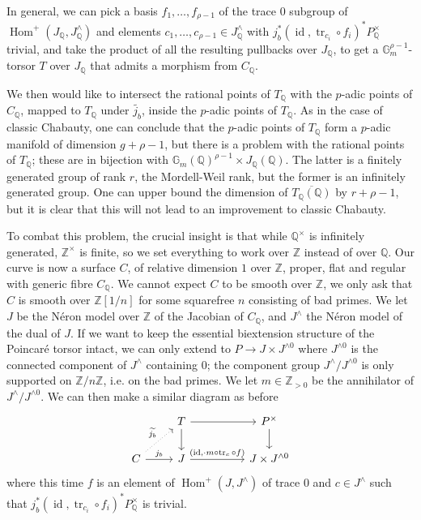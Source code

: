 \documentclass[12pt]{article}
\newcommand{\Z}{\mathbb{Z}}
\renewcommand{\G}{\mathbb{G}}
\newcommand{\Q}{\mathbb{Q}}
\DeclareMathOperator{\Hom}{Hom}
\DeclareMathOperator{\id}{id}
\DeclareMathOperator{\tr}{tr}
\theoremstyle{plain}
\theoremstyle{definition}
\theoremstyle{remark}
\begin{document}
In general, we can pick a basis $f_1,\dots,f_{\rho-1}$ of the trace $0$ subgroup of $\Hom^+(J_\Q,J^\wedge_\Q)$ and elements $c_1,\dots,c_{\rho-1} \in J_\Q^\wedge$ with $j_b^* (\id,\tr_{c_i} \circ f_i)^* P_{\Q}^\times$ trivial, and take the product of all the resulting pullbacks over $J_\Q$, to get a $\G_m^{\rho-1}$-torsor $T$ over $J_\Q$ that admits a morphism from $C_\Q$.

We then would like to intersect the rational points of $T_\Q$ with the $p$-adic points of $C_\Q$, mapped to $T_\Q$ under $\widetilde{j_b}$, inside the $p$-adic points of $T_\Q$. As in the case of classic Chabauty, one can conclude that the $p$-adic points of $T_\Q$ form a $p$-adic manifold of dimension $g+\rho-1$, but there is a problem with the rational points of $T_\Q$; these are in bijection with $\G_m(\Q)^{\rho-1} \times J_\Q(\Q)$. The latter is a finitely generated group of rank $r$, the Mordell-Weil rank, but the former is an infinitely generated group. One can upper bound the dimension of $\overline{T_\Q(\Q)}$ by $r + \rho -1$, but it is clear that this will not lead to an improvement to classic Chabauty.

To combat this problem, the crucial insight is that while $\Q^\times$ is infinitely generated, $\Z^\times$ is finite, so we set everything to work over $\Z$ instead of over $\Q$. Our curve is now a surface $C$, of relative dimension $1$ over $\Z$, proper, flat and regular with generic fibre $C_\Q$. We cannot expect $C$ to be smooth over $\Z$, we only ask that $C$ is smooth over $\Z[1/n]$ for some squarefree $n$ consisting of bad primes. We let $J$ be the N\'eron model over $\Z$ of the Jacobian of $C_\Q$, and $J^\wedge$ the N\'eron model of the dual of $J$. If we want to keep the essential biextension structure of the Poincar\'e torsor intact, we can only extend to $P \to J \times J^{\wedge 0}$ where $J^{\wedge 0}$ is the connected component of $J^\wedge$ containing $0$; the component group $J^\wedge/J^{\wedge 0}$ is only supported on $\Z/n\Z$, i.e. on the bad primes. We let $m\in \Z_{>0}$ be the annihilator of $J^\wedge/J^{\wedge 0}$. We can then make a similar diagram as before
\[\begin{tikzcd} %
                                                & T \arrow[d] \arrow[rr]                   && P^\times \arrow[d]      \\
C \arrow[ru, "\widetilde{j_b}", dotted] \arrow[r, "j_b"] & J \arrow[rr, "{(\id,\cdot m \circ\tr_c \circ f)}"] && J \times J^{\wedge 0}
\end{tikzcd}\]
where this time $f$ is an element of $\Hom^+(J,J^\wedge)$ of trace $0$ and $c \in J^{\wedge}$ such that $j_b^* (\id,\tr_{c_i} \circ f_i)^* P_{\Q}^\times$ is trivial.
\end{document}

